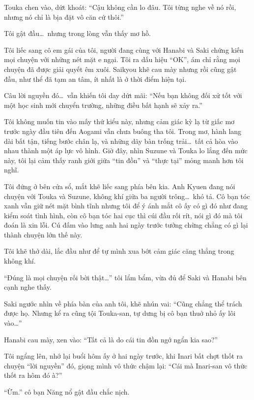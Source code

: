 \documentclass[../main.tex]{subfiles}
\begin{document}
Touka chen vào, dứt khoát: ``Cậu không cần lo đâu. Tôi từng nghe về nó rồi, nhưng nó chỉ là bịa đặt vô căn cứ thôi.''

Tôi gật đầu\dots\ nhưng trong lòng vẫn thấy mơ hồ.

Tôi liếc sang cô em gái của tôi, người đang cùng với Hanabi và Saki chứng kiến mọi chuyện với những nét mặt e ngại. Tôi ra dấu hiệu ``OK'', ám chỉ rằng mọi chuyện đã được giải quyết êm xuôi. Saikyou khẽ cau mày nhưng rồi cũng gật đầu, như thể đã tạm an tâm, ít nhất là ở thời điểm hiện tại.

Câu lời nguyền đó\dots\ vẫn khiến tôi day dứt mãi: ``Nếu bạn không đối xử tốt với một học sinh mới chuyển trường, những điều bất hạnh sẽ xảy ra.''

Tôi không muốn tin vào mấy thứ kiểu này, nhưng cảm giác kỳ lạ từ giấc mơ trước ngày đầu tiên đến Aogami vẫn chưa buông tha tôi. Trong mơ, hành lang dài bất tận, tiếng bước chân lạ, và những dãy bàn trống trải\dots\ tất cả hòa vào nhau thành một áp lực vô hình. Giờ đây, nhìn Suzune và Touka lo lắng đến mức này, tôi lại cảm thấy ranh giới giữa ``tin đồn'' và ``thực tại'' mỏng manh hơn tôi nghĩ.


Tôi đứng ở bên cửa sổ, mắt khẽ liếc sang phía bên kia. Anh Kyuen đang nói chuyện với Touka và Suzune, không khí giữa ba người trông\dots\ khó tả. Cô bạn tóc xanh vẫn giữ nét mặt bình tĩnh nhưng tôi để ý ánh mắt cô ấy có gì đó như đang kiểm soát tình hình, còn cô bạn tóc hai cục thì cúi đầu rối rít, nói gì đó mà tôi đoán là xin lỗi. Cú đấm vào lưng anh hai ngày trước tưởng chừng chẳng có gì  lại thành chuyện lớn thế này.

Tôi khẽ thở dài, lắc đầu như để tự mình xua bớt cảm giác căng thẳng trong không khí.

``Đúng là mọi chuyện rối bời thật\dots'' tôi lẩm bẩm, vừa đủ để Saki và Hanabi bên cạnh nghe thấy.

Saki ngước nhìn về phía bàn của anh tôi, khẽ nhún vai: ``Cũng chẳng thể trách được họ. Nhưng kể ra cũng tội Touka-san, tự dưng bị cô bạn thuở nhỏ ấy lôi vào\dots''

Hanabi cau mày, xen vào: ``Tất cả là do cái tin đồn ngớ ngẩn kia sao?''

Tôi ngẩng lên, nhớ lại buổi hôm ấy ở hai ngày trước, khi Inari bất chợt thốt ra chuyện ``lời nguyền'' đó, giọng mình vô thức chậm lại: ``Cái mà Inari-san vô thức thốt ra hôm đó à?''

``Ừm.'' cô bạn Năng nổ gật đầu chắc nịch.
\end{document}
